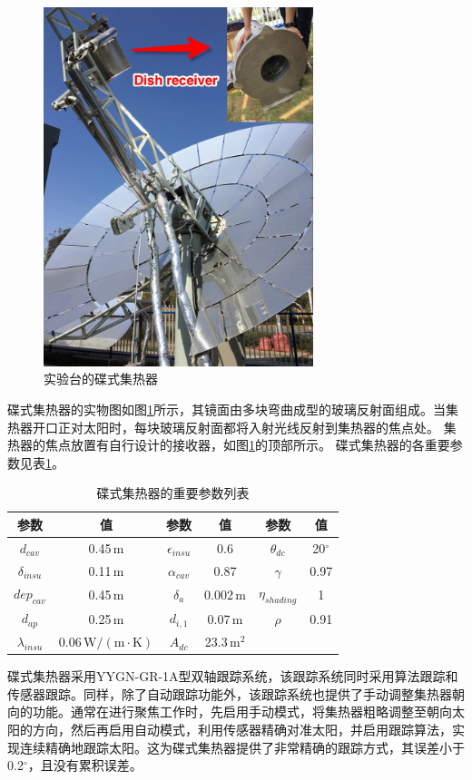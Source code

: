 \begin{figure}[!ht]
\centering
\includegraphics[width=0.7\textwidth]{fig/DishCollector.jpg}
\caption{实验台的碟式集热器}
\label{fig:DishCollector}
\end{figure}
碟式集热器的实物图如图\ref{fig:DishCollector}所示，其镜面由多块弯曲成型的玻璃反射面组成。当集热器开口正对太阳时，每块玻璃反射面都将入射光线反射到集热器的焦点处。
集热器的焦点放置有自行设计的接收器，如图\ref{fig:DishCollector}的顶部所示。
碟式集热器的各重要参数见表\ref{tab:ddc}。
\begin{table}[htbp]
\setlength{\abovecaptionskip}{-10pt}
	\caption{碟式集热器的重要参数列表}
	\begin{center}
	\begin{tabular}{cccccc}
		\toprule
		参数		&	值	&	参数		&	值	&	参数		&	值\\
		\midrule
		$d_{cav}$	&	0.45$\,\mathrm{m}$	&	$\epsilon_{insu}$	&	0.6	&	$\theta_{dc}$	&	20$^\circ$\\
		$\delta_{insu}$	&	0.11$\,\mathrm{m}$	&	$\alpha_{cav}$	&	0.87	&	$\gamma$	&	0.97\\
		$dep_{cav}$	&	0.45$\,\mathrm{m}$	&	$\delta_a$		&	0.002$\,\mathrm{m}$	&	$\eta_{shading}$	&	1\\
		$d_{ap}$	&	0.25$\,\mathrm{m}$	&	$d_{i,1}$	&	0.07$\,\mathrm{m}$	&	$\rho$	&	0.91\\
		$\lambda_{insu}$	&	0.06$\,\mathrm{W/(m\cdot K)}$	&	$A_{dc}$	&	23.3$\,\mathrm{m^2}$	&	\\		
		\bottomrule
	\end{tabular}
	\end{center}
	\label{tab:ddc}
\end{table}
碟式集热器采用YYGN-GR-1A型双轴跟踪系统，该跟踪系统同时采用算法跟踪和传感器跟踪。同样，除了自动跟踪功能外，该跟踪系统也提供了手动调整集热器朝向的功能。通常在进行聚焦工作时，先启用手动模式，将集热器粗略调整至朝向太阳的方向，然后再启用自动模式，利用传感器精确对准太阳，并启用跟踪算法，实现连续精确地跟踪太阳。这为碟式集热器提供了非常精确的跟踪方式，其误差小于0.2$^\circ$，且没有累积误差。

